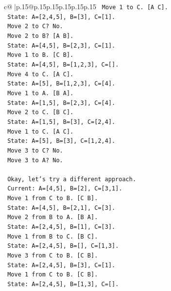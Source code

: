 \documentclass{article}
\begin{document}
{\begin{supertabular}{c@{$\;$}|p{.15\linewidth}@{}p{.15\linewidth}p{.15\linewidth}p{.15\linewidth}p{.15\linewidth}p{.15\linewidth}}
{{{\texttt{   Move 1 to C. {[}A C{]}.} \\
\texttt{   State: A={[}2,4,5{]}, B={[}3{]}, C={[}1{]}.} \\
\texttt{   Move 2 to C? No.} \\
\texttt{   Move 2 to B? {[}A B{]}.} \\
\texttt{   State: A={[}4,5{]}, B={[}2,3{]}, C={[}1{]}.} \\
\texttt{   Move 1 to B. {[}C B{]}.} \\
\texttt{   State: A={[}4,5{]}, B={[}1,2,3{]}, C={[}{]}.} \\
\texttt{   Move 4 to C. {[}A C{]}.} \\
\texttt{   State: A={[}5{]}, B={[}1,2,3{]}, C={[}4{]}.} \\
\texttt{   Move 1 to A. {[}B A{]}.} \\
\texttt{   State: A={[}1,5{]}, B={[}2,3{]}, C={[}4{]}.} \\
\texttt{   Move 2 to C. {[}B C{]}.} \\
\texttt{   State: A={[}1,5{]}, B={[}3{]}, C={[}2,4{]}.} \\
\texttt{   Move 1 to C. {[}A C{]}.} \\
\texttt{   State: A={[}5{]}, B={[}3{]}, C={[}1,2,4{]}.} \\
\texttt{   Move 3 to C? No.} \\
\texttt{   Move 3 to A? No.} \\
\\ 
\texttt{   Okay, let's try a different approach.} \\
\texttt{   Current: A={[}4,5{]}, B={[}2{]}, C={[}3,1{]}.} \\
\texttt{   Move 1 from C to B. {[}C B{]}.} \\
\texttt{   State: A={[}4,5{]}, B={[}2,1{]}, C={[}3{]}.} \\
\texttt{   Move 2 from B to A. {[}B A{]}.} \\
\texttt{   State: A={[}2,4,5{]}, B={[}1{]}, C={[}3{]}.} \\
\texttt{   Move 1 from B to C. {[}B C{]}.} \\
\texttt{   State: A={[}2,4,5{]}, B={[}{]}, C={[}1,3{]}.} \\
\texttt{   Move 3 from C to B. {[}C B{]}.} \\
\texttt{   State: A={[}2,4,5{]}, B={[}3{]}, C={[}1{]}.} \\
\texttt{   Move 1 from C to B. {[}C B{]}.} \\
\texttt{   State: A={[}2,4,5{]}, B={[}1,3{]}, C={[}{]}.} \\
}}}
\end{supertabular}}
\end{document}
